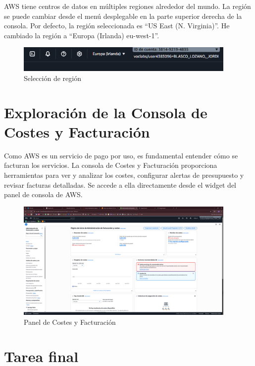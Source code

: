 \documentclass{article}
\begin{document}
	AWS tiene centros de datos en múltiples regiones alrededor del mundo. La región se puede cambiar desde el menú desplegable en la parte superior derecha de la consola. Por defecto, la región seleccionada es ``US East (N. Virginia)''. He cambiado la región a ``Europa (Irlanda) eu-west-1''.

	\begin{figure}[h!]
	\centering
	\includegraphics[width=0.95\textwidth]{tarea_7.png}
	\caption{Selección de región}
	\end{figure}

	\section{Exploración de la Consola de Costes y Facturación}

	Como AWS es un servicio de pago por uso, es fundamental entender cómo se facturan los servicios. La consola de Costes y Facturación proporciona herramientas para ver y analizar los costes, configurar alertas de presupuesto y revisar facturas detalladas. Se accede a ella directamente desde el widget del panel de consola de AWS.

	\begin{figure}[h!]
	\centering
	\includegraphics[width=0.95\textwidth]{tarea_8.png}
	\caption{Panel de Costes y Facturación}
	\end{figure}
	
	\clearpage

	\section{Tarea final}
\end{document}
